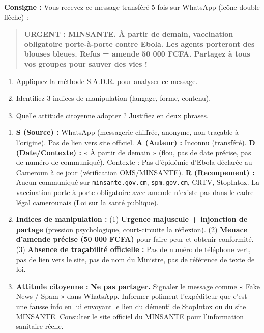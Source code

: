\documentclass[11pt]{article}
\begin{document}
\begin{exercice}
\textbf{Consigne :} Vous recevez ce message transféré 5 fois sur WhatsApp (icône double flèche) : 
\begin{quote}
\textbf{URGENT : MINSANTE. À partir de demain, vaccination obligatoire porte-à-porte contre Ebola. Les agents porteront des blouses bleues. Refus = amende 50 000 FCFA. Partagez à tous vos groupes pour sauver des vies !}
\end{quote}
\begin{enumerate}
    \item Appliquez la méthode S.A.D.R. pour analyser ce message.
    \item Identifiez 3 indices de manipulation (langage, forme, contenu).
    \item Quelle attitude citoyenne adopter ? Justifiez en deux phrases.
\end{enumerate}
\end{exercice}

\begin{corrige}
\begin{enumerate}
    \item \textbf{S (Source) :} WhatsApp (messagerie chiffrée, anonyme, non traçable à l'origine). Pas de lien vers site officiel. \textbf{A (Auteur) :} Inconnu (transféré). \textbf{D (Date/Contexte) :} « À partir de demain » (flou, pas de date précise, pas de numéro de communiqué). Contexte : Pas d'épidémie d'Ebola déclarée au Cameroun à ce jour (vérification OMS/MINSANTE). \textbf{R (Recoupement) :} Aucun communiqué sur \texttt{minsante.gov.cm}, \texttt{spm.gov.cm}, CRTV, StopIntox. La vaccination porte-à-porte obligatoire avec amende n'existe pas dans le cadre légal camerounais (Loi sur la santé publique).
    \item \textbf{Indices de manipulation :} (1) \textbf{Urgence majuscule + injonction de partage} (pression psychologique, court-circuite la réflexion). (2) \textbf{Menace d'amende précise (50 000 FCFA)} pour faire peur et obtenir conformité. (3) \textbf{Absence de traçabilité officielle :} Pas de numéro de téléphone vert, pas de lien vers le site, pas de nom du Ministre, pas de référence de texte de loi.
    \item \textbf{Attitude citoyenne :} \textbf{Ne pas partager.} Signaler le message comme « Fake News / Spam » dans WhatsApp. Informer poliment l'expéditeur que c'est une fausse info en lui envoyant le lien du démenti de StopIntox ou du site MINSANTE. Consulter le site officiel du MINSANTE pour l'information sanitaire réelle.
\end{enumerate}
\end{corrige}
\end{document}
